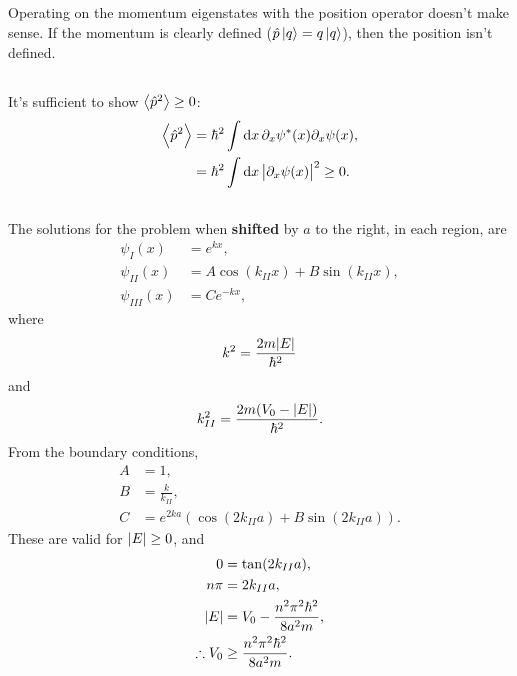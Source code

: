 \documentclass[a4paper,12pt,twoside]{article}
\begin{document}
\subsection{}%
Operating on the momentum eigenstates with the position operator doesn't make sense.
If the momentum is clearly defined ($\hat{p}\ket{q} = q\ket{q}$), then the position isn't defined.
\subsection{}%
It's sufficient to show $\ev{\hat{p}^2}\geq0$:
\begin{align}
	\ev{\hat{p}^2}
	&= \hbar^2 \int \dd{x} \partial_x\psi^*(x)\partial_x\psi(x),\\
	&= \hbar^2 \int \dd{x} \abs{\partial_x\psi(x)}^2 \geq 0.
\end{align}
\subsection{}%
The solutions for the problem when \textbf{shifted} by $a$ to the right, in each region, are
\begin{align}
	\psi_I(x) &= e^{kx},\\
	\psi_{II}(x) &= A\cos(k_{II}x) + B\sin(k_{II}x),\\
	\psi_{III}(x) &= Ce^{-kx},
\end{align}
where
\begin{equation}
	k^2 = \frac{2m\abs{E}}{\hbar^2}
\end{equation}
and
\begin{equation}
	k_{II}^2 = \frac{2m(V_0-\abs{E})}{\hbar^2}.
\end{equation}
From the boundary conditions,
\begin{align}
	A &= 1,\\
	B &= \frac{k}{k_{II}},\\
	C &= e^{2ka}\left(\cos(2k_{II}a)+B\sin(2k_{II}a)\right).
\end{align}
These are valid for $\abs{E} \geq 0$, and
\begin{align}
	0 &= \tan(2k_{II}a) ,\\
	n\pi &= 2k_{II}a,\\
	\abs{E} &= V_0 - \frac{n^2\pi^2\hbar^2}{8a^2m},\\
	\therefore V_0 &\geq \frac{n^2\pi^2\hbar^2}{8a^2m}.
\end{align}

\citation
\bibdata
\bibstyle





\end{document}
